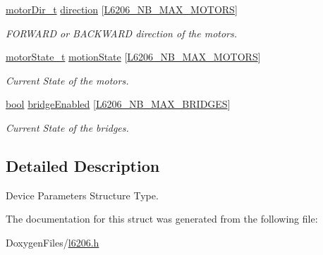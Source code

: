 \begin{DoxyCompactItemize}
\mbox{\label{structdevice_params__t_ad7a3b05d9d1885313de00fd680de5e0a}} 
\mbox{\hyperlink{group___device___direction___options_ga4eaf4196e4d11d552f58f3fab218a8c7}{motor\+Dir\+\_\+t}} \mbox{\hyperlink{structdevice_params__t_ad7a3b05d9d1885313de00fd680de5e0a}{direction}} \mbox{[}\mbox{\hyperlink{group___l6206___exported___constants_ga64b1ce7748d44eb6f6973dfe8c7fd196}{L6206\+\_\+\+N\+B\+\_\+\+M\+A\+X\+\_\+\+M\+O\+T\+O\+RS}}\mbox{]}
\begin{DoxyCompactList}\small\item\em F\+O\+R\+W\+A\+RD or B\+A\+C\+K\+W\+A\+RD direction of the motors. \end{DoxyCompactList}\item 
\mbox{\label{structdevice_params__t_af776d12dbf2213478b02d604fac81a89}} 
\mbox{\hyperlink{group___device___states_ga9ba865be7705688e94f95a410e917a07}{motor\+State\+\_\+t}} \mbox{\hyperlink{structdevice_params__t_af776d12dbf2213478b02d604fac81a89}{motion\+State}} \mbox{[}\mbox{\hyperlink{group___l6206___exported___constants_ga64b1ce7748d44eb6f6973dfe8c7fd196}{L6206\+\_\+\+N\+B\+\_\+\+M\+A\+X\+\_\+\+M\+O\+T\+O\+RS}}\mbox{]}
\begin{DoxyCompactList}\small\item\em Current State of the motors. \end{DoxyCompactList}\item 
\mbox{\label{structdevice_params__t_a7d064cc0096019e667d28c80c31be7a8}} 
\mbox{\hyperlink{group___motor___boolean___type_ga0ecf26b576b9a54eca656b9be7ba6a06}{bool}} \mbox{\hyperlink{structdevice_params__t_a7d064cc0096019e667d28c80c31be7a8}{bridge\+Enabled}} \mbox{[}\mbox{\hyperlink{group___l6206___exported___constants_gae72db6f074defd956d309151334f448d}{L6206\+\_\+\+N\+B\+\_\+\+M\+A\+X\+\_\+\+B\+R\+I\+D\+G\+ES}}\mbox{]}
\begin{DoxyCompactList}\small\item\em Current State of the bridges. \end{DoxyCompactList}\end{DoxyCompactItemize}


\subsection{Detailed Description}
Device Parameters Structure Type. 

The documentation for this struct was generated from the following file\+:\begin{DoxyCompactItemize}
\item 
Doxygen\+Files/\mbox{\hyperlink{l6206_8h}{l6206.\+h}}\end{DoxyCompactItemize}
